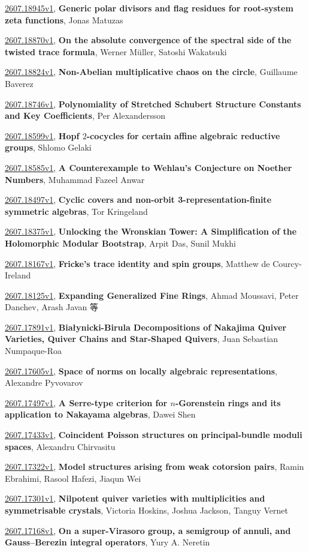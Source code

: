 \documentclass[9pt, a4paper]{article}
\theoremstyle{plain}
\theoremstyle{definition}
\theoremstyle{remark}
\newcommand{\arxiv}[3]{\href{https://arxiv.org/abs/#1}{#1}, \textbf{\textcolor{arxivblue}{#2}}, #3}
\begin{document}
\arxiv{2607.18945v1}{Generic polar divisors and flag residues for root-system zeta functions}{Jonas Matuzas}

\arxiv{2607.18870v1}{On the absolute convergence of the spectral side of the twisted trace formula}{Werner Müller, Satoshi Wakatsuki}

\arxiv{2607.18824v1}{Non-Abelian multiplicative chaos on the circle}{Guillaume Baverez}

\arxiv{2607.18746v1}{Polynomiality of Stretched Schubert Structure Constants and Key Coefficients}{Per Alexandersson}

\arxiv{2607.18599v1}{Hopf $2$-cocycles for certain affine algebraic reductive groups}{Shlomo Gelaki}

\arxiv{2607.18585v1}{A Counterexample to Wehlau's Conjecture on Noether Numbers}{Muhammad Fazeel Anwar}

\arxiv{2607.18497v1}{Cyclic covers and non-orbit 3-representation-finite symmetric algebras}{Tor Kringeland}

\arxiv{2607.18375v1}{Unlocking the Wronskian Tower: A Simplification of the Holomorphic Modular Bootstrap}{Arpit Das, Sunil Mukhi}

\arxiv{2607.18167v1}{Fricke's trace identity and spin groups}{Matthew de Courcy-Ireland}

\arxiv{2607.18125v1}{Expanding Generalized Fine Rings}{Ahmad Moussavi, Peter Danchev, Arash Javan 等}

\arxiv{2607.17891v1}{Białynicki-Birula Decompositions of Nakajima Quiver Varieties, Quiver Chains and Star-Shaped Quivers}{Juan Sebastian Numpaque-Roa}

\arxiv{2607.17605v1}{Space of norms on locally algebraic representations}{Alexandre Pyvovarov}

\arxiv{2607.17497v1}{A Serre-type criterion for $n$-Gorenstein rings and its application to Nakayama algebras}{Dawei Shen}

\arxiv{2607.17433v1}{Coincident Poisson structures on principal-bundle moduli spaces}{Alexandru Chirvasitu}

\arxiv{2607.17322v1}{Model structures arising from weak cotorsion pairs}{Ramin Ebrahimi, Rasool Hafezi, Jiaqun Wei}

\arxiv{2607.17301v1}{Nilpotent quiver varieties with multiplicities and symmetrisable crystals}{Victoria Hoskins, Joshua Jackson, Tanguy Vernet}

\arxiv{2607.17168v1}{On a super-Virasoro group, a semigroup of annuli, and Gauss--Berezin integral operators}{Yury A. Neretin}
\end{document}
